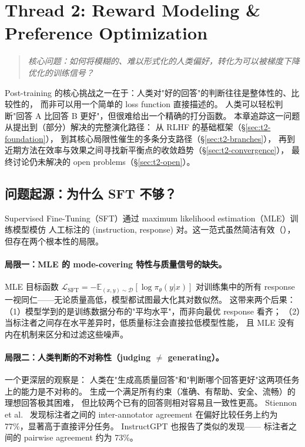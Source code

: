 \section{Thread 2: Reward Modeling \& Preference Optimization}
\label{sec:t2}

\begin{quote}
\textit{核心问题：如何将模糊的、难以形式化的人类偏好，转化为可以被梯度下降优化的训练信号？}
\end{quote}

\noindent
Post-training 的核心挑战之一在于：人类对"好的回答"的判断往往是整体性的、比较性的，
而非可以用一个简单的 loss function 直接描述的。
人类可以轻松判断"回答 A 比回答 B 更好"，但很难给出一个精确的打分函数。
本章追踪这一问题从提出到（部分）解决的完整演化路径：
从 RLHF 的基础框架（\S\ref{sec:t2-foundation}），
到其核心局限性催生的多条分支路径（\S\ref{sec:t2-branches}），
再到近期方法在效率与效果之间寻找新平衡点的收敛趋势（\S\ref{sec:t2-convergence}），
最终讨论仍未解决的 open problems（\S\ref{sec:t2-open}）。

\subsection{问题起源：为什么 SFT 不够？}
\label{sec:t2-origin}

Supervised Fine-Tuning（SFT）通过 maximum likelihood estimation（MLE）训练模型模仿
人工标注的 (instruction, response) 对。这一范式虽然简洁有效（），
但存在两个根本性的局限。

\paragraph{局限一：MLE 的 mode-covering 特性与质量信号的缺失。}
MLE 目标函数 $\mathcal{L}_{\text{SFT}} = -\mathbb{E}_{(x,y)\sim\mathcal{D}}\left[\log \pi_\theta(y|x)\right]$
对训练集中的所有 response 一视同仁——无论质量高低，模型都试图最大化其对数似然。
这带来两个后果：
（1）模型学到的是训练数据分布的"平均水平"，而非向最优 response 看齐；
（2）当标注者之间存在水平差异时，低质量标注会直接拉低模型性能，
且 MLE 没有内在机制来区分和过滤这些噪声。

\paragraph{局限二：人类判断的不对称性（judging $\neq$ generating）。}
一个更深层的观察是：
人类在"生成高质量回答"和"判断哪个回答更好"这两项任务上的能力是不对称的。
生成一个满足所有约束（准确、有帮助、安全、流畅）的理想回答极其困难，
但比较两个已有的回答则相对容易且一致性更高。
Stiennon et al.\ \cite{stiennon2020summarize} 发现标注者之间的 inter-annotator agreement
在偏好比较任务上约为 77\%，显著高于直接评分任务。
InstructGPT \cite{ouyang2022instructgpt} 也报告了类似的发现——
标注者之间的 pairwise agreement 约为 73\%。


